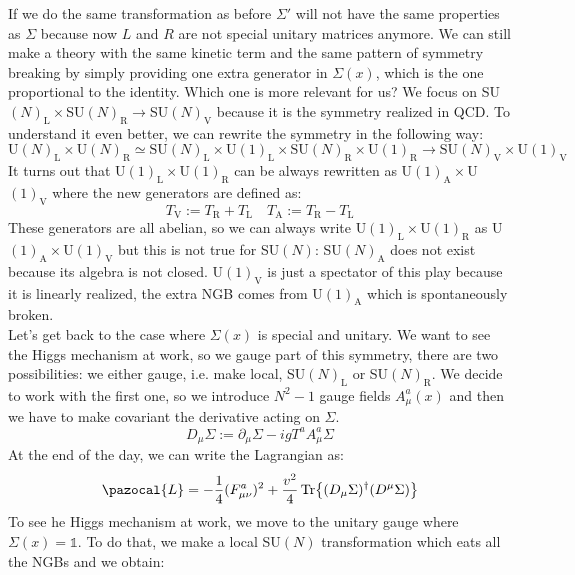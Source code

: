 \documentclass[../main.tex]{subfiles}
\begin{document}
If we do the same transformation as before $\Sigma'$ will not have the same properties as $\Sigma$ because now $L$ and $R$ are not special unitary matrices anymore. We can still make a theory with the same kinetic term and the same pattern of symmetry breaking by simply providing one extra generator in $\Sigma(x)$, which is the one proportional to the identity. Which one is more relevant for us? We focus on SU$(N)_{\text{L}}\times$SU$(N)_{\text{R}}\to$SU$(N)_{\text{V}}$ because it is the symmetry realized in QCD. To understand it even better, we can rewrite the symmetry in the following way:
\[
\text{U}(N)_{\text{L}}\times\text{U}(N)_{\text{R}}\simeq\text{SU}(N)_{\text{L}}\times\text{U}(1)_{\text{L}}\times\text{SU}(N)_{\text{R}}\times\text{U}(1)_{\text{R}}\to\text{SU}(N)_{\text{V}}\times\text{U}(1)_{\text{V}}
\]
It turns out that U$(1)_{\text{L}}\times$U$(1)_{\text{R}}$ can be always rewritten as U$(1)_{\text{A}}\times$U$(1)_{\text{V}}$ where the new generators are defined as:
\[
T_{\text{V}}:=T_{\text{R}}+T_{\text{L}} \quad T_{\text{A}}:=T_{\text{R}}-T_{\text{L}}
\]
These generators are all abelian, so we can always write U$(1)_{\text{L}}\times$U$(1)_{\text{R}}$ as U$(1)_{\text{A}}\times$U$(1)_{\text{V}}$ but this is not true for SU$(N)$: SU$(N)_{\text{A}}$ does not exist because its algebra is not closed. U$(1)_{\text{V}}$ is just a spectator of this play because it is linearly realized, the extra NGB comes from U$(1)_{\text{A}}$ which is spontaneously broken.\\
Let's get back to the case where $\Sigma(x)$ is special and unitary. We want to see the Higgs mechanism at work, so we gauge part of this symmetry, there are two possibilities: we either gauge, i.e. make local, SU$(N)_{\text{L}}$ or SU$(N)_{\text{R}}$. We decide to work with the first one, so we introduce $N^2-1$ gauge fields $A_\mu^a(x)$ and then we have to make covariant the derivative acting on $\Sigma$.
\[
D_\mu\Sigma:=\partial_\mu\Sigma-igT^aA_\mu^a\Sigma
\]
At the end of the day, we can write the Lagrangian as:
\[
\pazocal{L}=-\frac{1}{4}(F_{\mu\nu}^a)^2+\frac{v^2}{4}\Tr{(D_\mu\Sigma)^\dagger(D^\mu\Sigma)}
\]
To see he Higgs mechanism at work, we move to the unitary gauge where $\Sigma(x)=\mathbb{1}$. To do that, we make a local SU$(N)$ transformation which eats all the NGBs and we obtain:
\end{document}
